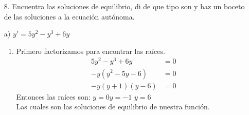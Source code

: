 \begin{enumerate}
    \item[8.] Encuentra las soluciones de equilibrio, di de que tipo son y haz un boceto de las soluciones a la ecuación autónoma.
\end{enumerate}


\begin{itemize}
    \item[a)] $y'=5y^2-y^3+6y$
    \begin{enumerate}
        \item Primero factorizamos para encontrar las raíces.
        \begin{align*}
            5y^2-y^3+6y &= 0 \\
            -y(y^2-5y-6) &= 0 \\
            -y(y+1)(y-6) &= 0
        \end{align*}
        Entonces las raíces son:\hspace{.5cm} $y=0$\hspace{.5cm}$y=-1$\hspace{.5cm} $y=6$\\
        Las cuales son las soluciones de equilibrio de nuestra función.
        

\end{enumerate}
\end{itemize}
